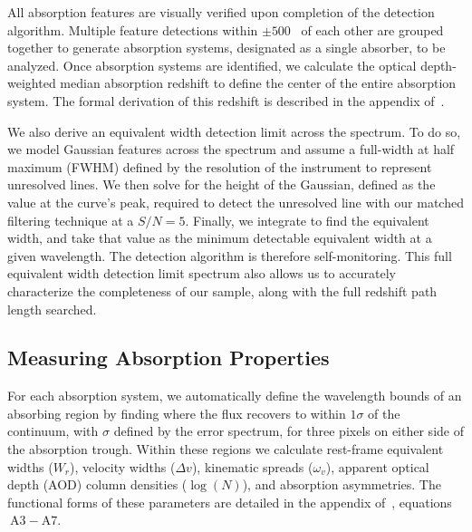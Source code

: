 \documentclass[iop,apj,numberedappendix,appendixfloats,twocolappendix]{emulateapj}
\begin{document}
All absorption features are visually verified upon completion of the detection algorithm. Multiple feature detections within $\pm 500$~{\kms} of each other are grouped together to generate absorption systems, designated as a single absorber, to be analyzed. Once absorption systems are identified, we calculate the optical depth-weighted median absorption redshift to define the center of the entire absorption system. The formal derivation of this redshift is described in the appendix of~\cite{Churchill2001}.


We also derive an equivalent width detection limit across the spectrum. To do so, we model Gaussian features across the spectrum and assume a full-width at half maximum (FWHM) defined by the resolution of the instrument to represent unresolved lines. We then solve for the height of the Gaussian, defined as the value at the curve's peak, required to detect the unresolved line with our matched filtering technique at a $S/N = 5$. Finally, we integrate to find the equivalent width, and take that value as the minimum detectable equivalent width at a given wavelength. The detection algorithm is therefore self-monitoring. This full equivalent width detection limit spectrum also allows us to accurately characterize the completeness of our sample, along with the full redshift path length searched. 


\subsection{Measuring Absorption Properties}
\label{sec:measuring}

For each absorption system, we automatically define the wavelength bounds of an absorbing region by finding where the flux recovers to within $1\sigma$ of the continuum, with $\sigma$ defined by the error spectrum, for three pixels on either side of the absorption trough. Within these regions we calculate rest-frame equivalent widths ($W_r$), velocity widths ($\Delta v$), kinematic spreads ($\omega_v$), apparent optical depth (AOD) column densities ($\log(N)$), and absorption asymmetries. The functional forms of these parameters are detailed in the appendix of~\cite{Churchill2001}, equations$~\mathrm{A3 - A7}$.


\end{document}
